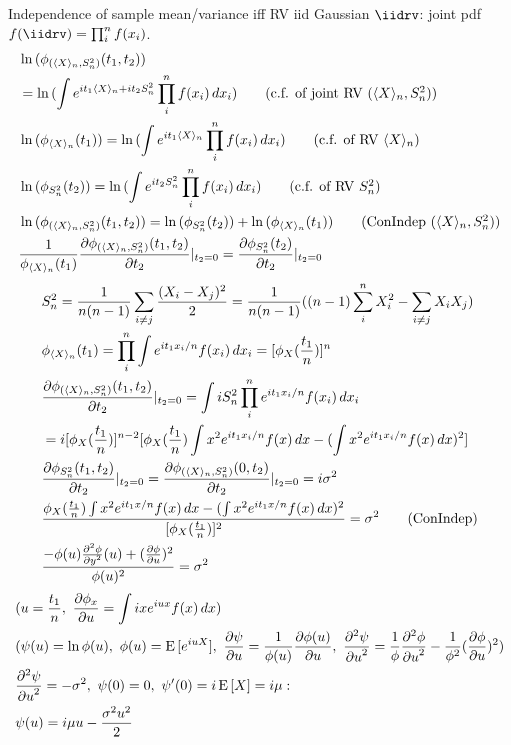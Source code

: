 \documentclass[asd-beamer.tex]{subfiles}
\begin{document}
\begin{frame}{Independence of sample mean/variance iff RV iid Gaussian}
	$\iidrv$: joint pdf $f(\iidrv)=\prod_i^nf(x_i)$.
	\begin{align*}
	&\ln{(\phi_{(\exv{X}_n,S_n^2)}(t_1,t_2))}\\
	&=\ln{(\int\exp{it_1\exv{X}_n+it_2S_n^2}\prod_i^nf(x_i)\,dx_i)}\tag{c.f. of joint RV $(\exv{X}_n,S_n^2)$}\\
	&\ln{(\phi_{\exv{X}_n}(t_1))}=\ln{(\int\exp{it_1\exv{X}_n}\prod_i^nf(x_i)\,dx_i)}\tag{c.f. of RV $\exv{X}_n$}\\
	&\ln{(\phi_{S_n^2}(t_2))}=\ln{(\int\exp{it_2S_n^2}\prod_i^nf(x_i)\,dx_i)}\tag{c.f. of RV $S_n^2$}\\
	&\ln{(\phi_{(\exv{X}_n,S_n^2)}(t_1,t_2))}=\ln{(\phi_{S_n^2}(t_2))}+\ln{(\phi_{\exv{X}_n}(t_1))}\tag{ConIndep ($\exv{X}_n, S_n^2$)}\\
	&\frac{1}{\phi_{\exv{X}_n}(t_1)}\PDy{t_2}{\phi_{(\exv{X}_n,S_n^2)}(t_1,t_2)}|_{t_2=0}=\PDy{t_2}{\phi_{S_n^2}(t_2)}|_{t_2=0}
	\end{align*}
	\begin{align*}
	&S_n^2=\frac{1}{n(n-1)}\sum_{i\neq j}\frac{(X_i-X_j)^2}{2}=\frac{1}{n(n-1)}((n-1)\sum_i^nX_i^2-\sum_{i\neq j}X_iX_j)\\
	&\phi_{\exv{X}_n}(t_1)=\prod_i^n\int\exp{it_1x_i/n}f(x_i)\,dx_i=[\phi_X(\frac{t_1}{n})]^n\\
	&\PDy{t_2}{\phi_{(\exv{X}_n,S_n^2)}(t_1,t_2)}|_{t_2=0}=\int iS_n^2\prod_i^n\exp{it_1x_i/n}f(x_i)\,dx_i\\
	&=i[\phi_X(\frac{t_1}{n})]^{n-2}[\phi_X(\frac{t_1}{n})\int x^2\exp{it_1x_i/n}f(x)\,dx-(\int x^2\exp{it_1x_i/n}f(x)\,dx)^2]\\
	&\PDy{t_2}{\phi_{S_n^2}(t_1,t_2)}|_{t_2=0}=\PDy{t_2}{\phi_{(\exv{X}_n,S_n^2)}(0,t_2)}|_{t_2=0}=i\sigma^2\\
	&\frac{\phi_X(\frac{t_1}{n})\int x^2\exp{it_1x/n}f(x)\,dx-(\int x^2\exp{it_1x/n}f(x)\,dx)^2}{[\phi_X(\frac{t_1}{n})]^2}=\sigma^2\tag{ConIndep}\\
	&\frac{-\phi(u)\PtwoDy{y}{\phi}(u)+(\PDy{u}{\phi})^2}{\phi(u)^2}=\sigma^2
	\end{align*}
	\begin{align*}
	&(u=\frac{t_1}{n},\ \PDy{u}{\phi_x}=\int ix\exp{iux}f(x)\,dx)\\
	&(\psi(u)=\ln{\phi(u)},\ \phi(u)=\E{[\exp{iuX}]},\ \PDy{u}{\psi}=\frac{1}{\phi(u)}\PDy{u}{\phi(u)},\ \PtwoDy{u}{\psi}=\frac{1}{\phi}\PtwoDy{u}{\phi}-\frac{1}{\phi^2}(\PDy{u}{\phi})^2)\\
	&\PtwoDy{u}{\psi}=-\sigma^2,\ \psi(0)=0,\ \psi'(0)=i\E{[X]}=i\mu:\\
	&\psi(u)=i\mu u-\frac{\sigma^2u^2}{2}
	\end{align*}
\end{frame}
\end{document}
